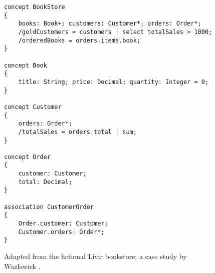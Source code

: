 \begin{figure}
\verbatimfont{\scriptsize}
\begin{verbatim}
concept BookStore
{
    books: Book+; customers: Customer*; orders: Order*;
    /goldCustomers = customers | select totalSales > 1000;
    /orderedBooks = orders.items.book;
}

concept Book
{
    title: String; price: Decimal; quantity: Integer = 0;
}

concept Customer
{
    orders: Order*;
    /totalSales = orders.total | sum;
}

concept Order
{
    customer: Customer;
    total: Decimal;
}

association CustomerOrder
{
    Order.customer: Customer;
    Customer.orders: Order*;
}
\end{verbatim}
\caption{Adapted from the fictional Livir bookstore; a case study by Wazlawick \cite{wazlawick}.}
\label{fig:store}
\end{figure}
